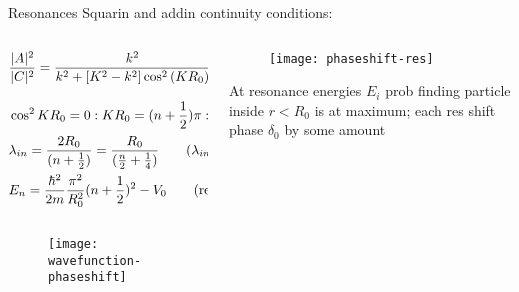 \begin{frame}{Resonances}
    Squarin and addin continuity conditions:
    \begin{columns}[T]
        \begin{column}{0.6\textwidth}
        \begin{align*}
            &\frac{|A|^2}{|C|^2}=\frac{k^2}{k^2+[K^2-k^2]\cos^2{(KR_0)}}=\frac{E}{E+V_0\cos^2{(\frac{\sqrt{2m(E+V_0)}}{\hbar}R_0)}}\\
            &\cos^2{KR_0}=0: KR_0=(n+\frac{1}{2})\pi: K=\frac{(n+\frac{1}{2})\pi}{R_0}=\frac{2\pi}{\lambda_{in}}\\
            &\lambda_{in}=\frac{2R_0}{(n+\frac{1}{2})}=\frac{R_0}{(\frac{n}{2}+\frac{1}{4})}\tag{$\lambda_{in}$ wavelength in interior}\\
            &E_n=\frac{\hbar^2}{2m}\frac{\pi^2}{R_0^2}(n+\frac{1}{2})^2-V_0\tag{resonance energy: $\frac{n}{2}+\frac{1}{4}$ wavelength fit into interior}
        \end{align*}
        \begin{columns}[T]
            \begin{column}{0.45\textwidth}
            \begin{figure}[!ht]
            \texttt{[image: wavefunction-phaseshift]}\label{fig:wavefunction-phaseshift}
			\end{figure}
            \end{column}
            \begin{column}{0.55\textwidth}
            \end{column}
        \end{columns}
    \end{column}
        \begin{column}{0.4\textwidth}
            \begin{figure}[!ht]
            \texttt{[image: phaseshift-res]}\label{fig:phaseshift-res}
			\end{figure}
            At resonance energies $E_i$ prob finding particle inside $r<R_0$ is at maximum; each res shift phase $\delta_0$ by some amount
        \end{column}
    \end{columns}
\end{frame}

